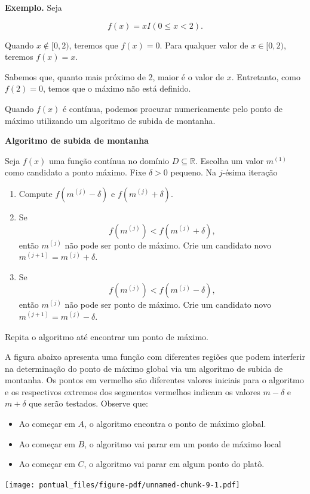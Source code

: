 \documentclass[
  letterpaper,
  DIV=11,
  numbers=noendperiod]{scrartcl}
\begin{document}
\textbf{Exemplo.} Seja

\[f(x)= xI(0\leq x < 2).\]

Quando \(x\notin[0,2)\), teremos que \(f(x)=0\). Para qualquer valor de
\(x\in[0,2)\), teremos \(f(x)=x\).

Sabemos que, quanto mais próximo de 2, maior é o valor de \(x\).
Entretanto, como \(f(2)=0\), temos que o máximo não está definido.

Quando \(f(x)\) é contínua, podemos procurar numericamente pelo ponto de
máximo utilizando um algoritmo de subida de montanha.

\textbf{Algoritmo de subida de montanha}

Seja \(f(x)\) uma função contínua no domínio \(D\subseteq \mathbb{R}\).
Escolha um valor \(m^{(1)}\) como candidato a ponto máximo. Fixe
\(\delta>0\) pequeno. Na \(j\)-ésima iteração

\begin{enumerate}
\def\labelenumi{\arabic{enumi}.}
\item
  Compute \(f(m^{(j)}-\delta)\) e \(f(m^{(j)}+\delta)\).
\item
  Se \[f(m^{(j)})< f(m^{(j)}+\delta),\] então \(m^{(j)}\) não pode ser
  ponto de máximo. Crie um candidato novo \(m^{(j+1)}=m^{(j)}+\delta\).
\item
  Se \[f(m^{(j)})< f(m^{(j)}-\delta),\] então \(m^{(j)}\) não pode ser
  ponto de máximo. Crie um candidato novo \(m^{(j+1)}=m^{(j)}-\delta\).
\end{enumerate}

Repita o algoritmo até encontrar um ponto de máximo.

A figura abaixo apresenta uma função com diferentes regiões que podem
interferir na determinação do ponto de máximo global via um algoritmo de
subida de montanha. Os pontos em vermelho são diferentes valores
iniciais para o algoritmo e os respectivos extremos dos segmentos
vermelhos indicam os valores \(m-\delta\) e \(m+\delta\) que serão
testados. Observe que:

\begin{itemize}
\item
  Ao começar em \(A\), o algoritmo encontra o ponto de máximo global.
\item
  Ao começar em \(B\), o algoritmo vai parar em um ponto de máximo local
\item
  Ao começar em \(C\), o algoritmo vai parar em algum ponto do platô.
\end{itemize}

\texttt{[image: pontual\_files/figure-pdf/unnamed-chunk-9-1.pdf]}
\end{document}

